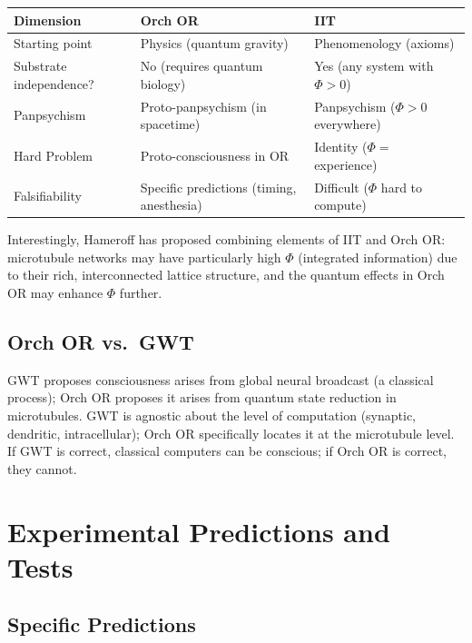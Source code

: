 \documentclass[11pt,a4paper]{report}
\begin{document}
\begin{compbox}
\renewcommand{\arraystretch}{1.4}
\begin{tabular}{>{\raggedright}p{3cm} >{\raggedright}p{5cm} >{\raggedright\arraybackslash}p{5cm}}
  \toprule
  \textbf{Dimension} & \textbf{Orch OR} & \textbf{IIT} \\
  \midrule
  Starting point & Physics (quantum gravity) & Phenomenology (axioms) \\
  Substrate independence? & No (requires quantum biology) & Yes (any system with $\Phi > 0$) \\
  Panpsychism & Proto-panpsychism (in spacetime) & Panpsychism ($\Phi > 0$ everywhere) \\
  Hard Problem & Proto-consciousness in OR & Identity ($\Phi =$ experience) \\
  Falsifiability & Specific predictions (timing, anesthesia) & Difficult ($\Phi$ hard to compute) \\
  \bottomrule
\end{tabular}
\end{compbox}

Interestingly, Hameroff has proposed combining elements of IIT and Orch OR: microtubule networks may have particularly high $\Phi$ (integrated information) due to their rich, interconnected lattice structure, and the quantum effects in Orch OR may enhance $\Phi$ further.

\section{Orch OR vs.\ GWT}

GWT proposes consciousness arises from global neural broadcast (a classical process); Orch OR proposes it arises from quantum state reduction in microtubules. GWT is agnostic about the level of computation (synaptic, dendritic, intracellular); Orch OR specifically locates it at the microtubule level. If GWT is correct, classical computers can be conscious; if Orch OR is correct, they cannot.


\chapter{Experimental Predictions and Tests}

\section{Specific Predictions}
\end{document}
